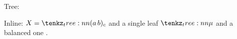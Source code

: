 \documentclass[varwidth=20cm, border=6pt]{standalone}
\begin{document}
Tree: 

Inline: $X = \tntree{(a\,b)_c}$ and a single leaf $\tntree{{\mu}}$
and a balanced one .
\end{document}
